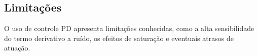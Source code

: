 \subsection{Limitações}
O uso de controle PD apresenta limitações conhecidas, como a alta sensibilidade do termo derivativo a ruído, os  efeitos de saturação e eventuais atrasos de atuação.